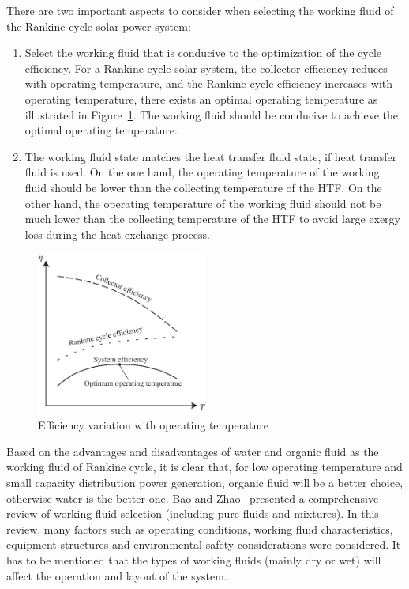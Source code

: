 There are two important aspects to consider when selecting the working fluid of the Rankine cycle solar power system:
\begin{enumerate}
  \item Select the working fluid that is conducive to the optimization of the cycle efficiency.  
  For a Rankine cycle solar system, the collector efficiency reduces with operating temperature, and the Rankine cycle efficiency increases with operating temperature, there exists an optimal operating temperature as illustrated in Figure~\ref{fig:Efficiency}. The working fluid should be conducive to achieve the optimal operating temperature.
  
  \item The working fluid state matches the heat transfer fluid state, if heat transfer fluid is used.
    On the one hand, the operating temperature of the working fluid should be lower than the collecting temperature of the HTF. On the other hand, the operating temperature of the working fluid should not be much lower than the collecting temperature of the HTF to avoid large exergy loss during the heat exchange process.
\end{enumerate}
\begin{figure}[!ht]
\centering 
\includegraphics[width=0.5\textwidth]{fig/Efficiency}
\caption{Efficiency variation with operating temperature}\label{fig:Efficiency}
\end{figure}

Based on the advantages and disadvantages of water and organic fluid as the working fluid of Rankine cycle, it is clear that, for low operating temperature and small capacity distribution power generation, organic fluid will be a better choice, otherwise water is the better one. Bao and Zhao~\cite{Bao2013} presented a comprehensive review of working fluid selection (including pure fluids and mixtures). In this review, many factors such as operating conditions, working fluid characteristics, equipment structures and environmental safety considerations were considered.
It has to be mentioned that the types of working fluids (mainly dry or wet) will affect the operation and layout of the system.

